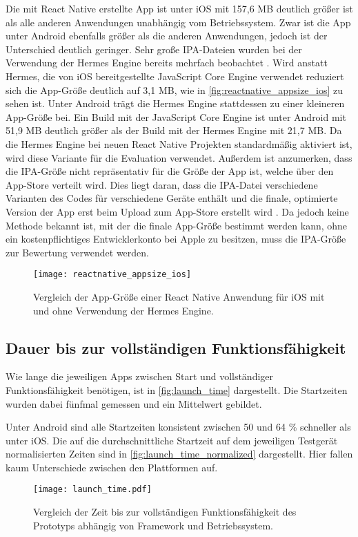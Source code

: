 Die mit React Native erstellte App ist unter iOS mit 157,6 MB deutlich größer ist als alle anderen Anwendungen unabhängig vom Betriebssystem.
Zwar ist die App unter Android ebenfalls größer als die anderen Anwendungen, jedoch ist der Unterschied deutlich geringer.
Sehr große \ac{IPA}-Dateien wurden bei der Verwendung der Hermes Engine bereits mehrfach beobachtet \cite{Hermes_appsize,Hermes_appsize_2}.
Wird anstatt Hermes, die von iOS bereitgestellte JavaScript Core Engine verwendet reduziert sich die App-Größe deutlich auf 3,1 MB, wie in \autoref{fig:reactnative_appsize_ios} zu sehen ist.
Unter Android trägt die Hermes Engine stattdessen zu einer kleineren App-Größe bei.
Ein Build mit der JavaScript Core Engine ist unter Android mit 51,9 MB deutlich größer als der Build mit der Hermes Engine mit 21,7 MB.
Da die Hermes Engine bei neuen React Native Projekten standardmäßig aktiviert ist, wird diese Variante für die Evaluation verwendet.
Außerdem ist anzumerken, dass die \ac{IPA}-Größe nicht repräsentativ für die Größe der App ist, welche über den App-Store verteilt wird.
Dies liegt daran, dass die \ac{IPA}-Datei verschiedene Varianten des Codes für verschiedene Geräte enthält und die finale, optimierte Version der App erst beim Upload zum App-Store erstellt wird \cite{IPA_Size}.
Da jedoch keine Methode bekannt ist, mit der die finale App-Größe bestimmt werden kann, ohne ein kostenpflichtiges Entwicklerkonto bei Apple zu besitzen, muss die \ac{IPA}-Größe zur Bewertung verwendet werden.

\begin{figure}[ht]
  \centering 
  \texttt{[image: reactnative\_appsize\_ios]}
   \caption{Vergleich der App-Größe einer React Native Anwendung für iOS mit und ohne Verwendung der Hermes Engine.}
  \label{fig:reactnative_appsize_ios}
\end{figure}


\subsection{Dauer bis zur vollständigen Funktionsfähigkeit}

Wie lange die jeweiligen Apps zwischen Start und vollständiger Funktionsfähigkeit benötigen, ist in \autoref{fig:launch_time} dargestellt.
Die Startzeiten wurden dabei fünfmal gemessen und ein Mittelwert gebildet.

Unter Android sind alle Startzeiten konsistent zwischen 50 und 64 \% schneller als unter iOS.
Die auf die durchschnittliche Startzeit auf dem jeweiligen Testgerät normalisierten Zeiten sind in \autoref{fig:launch_time_normalized} dargestellt.
Hier fallen kaum Unterschiede zwischen den Plattformen auf.
\begin{figure}[ht]
  \centering 
  \texttt{[image: launch\_time.pdf]}
  \caption{Vergleich der Zeit bis zur vollständigen Funktionsfähigkeit des Prototyps abhängig von Framework und Betriebssystem.}
  \label{fig:launch_time}
\end{figure}


